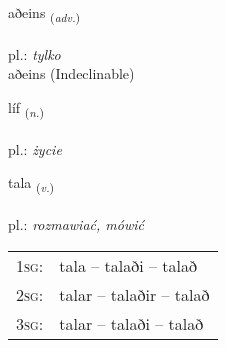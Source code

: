 \documentclass[frontgrid, backgrid]{flacards}\usepackage[]{graphicx}\usepackage[]{xcolor}
\begin{document}
{aðeins \small{\textsubscript{(\textit{adv.})}} \\[1ex]
\textphonetic{[aːðeins]} \\
pl.: \emph{tylko} \\  [2ex]
aðeins (Indeclinable)}

\renewcommand{\flhead}{\vskip5pt \fboxsep=0pt {\small\bfseries\footnotesize Nafnorð | Noun}}
\renewcommand{\fcfoot}{\vskip5pt \fboxsep=0pt \hspace{2pt}{\small\bfseries\footnotesize 1K}}

\renewcommand{\blhead}{\vskip5pt {\small\bfseries\footnotesize Nafnorð | Noun }}
\renewcommand{\bcfoot}{\vskip5pt \hspace{2pt}{\small\bfseries\footnotesize 1K}}


{líf \small{\textsubscript{(\textit{n.})}} \\[1ex] %
\textphonetic{[liːv]} \\
pl.: \emph{życie} \\  [2ex]
\renewcommand*{\arraystretch}{0.8}
}

\renewcommand{\flhead}{\vskip5pt \fboxsep=0pt {\small\bfseries\footnotesize Sagnorð | Verb}}
\renewcommand{\fcfoot}{\vskip5pt \fboxsep=0pt \hspace{2pt}{\small\bfseries\footnotesize 1K}}

\renewcommand{\blhead}{\vskip5pt {\small\bfseries\footnotesize Sagnorð | Verb }}
\renewcommand{\bcfoot}{\vskip5pt \hspace{2pt}{\small\bfseries\footnotesize 1K}}


{tala \small{\textsubscript{(\textit{v.})}} \\[1ex] %
\textphonetic{[tʰaːla]} \\
pl.: \emph{rozmawiać, mówić} \\  [2ex]
\renewcommand*{\arraystretch}{0.8}
\begin{tabular}{p{1cm}l}
\textsc{1sg}: & tala -- talaði -- talað \\ 
\textsc{2sg}: & talar -- talaðir -- talað \\ 
\textsc{3sg}: & talar -- talaði -- talað \\ 
\end{tabular}
}
\end{document}
